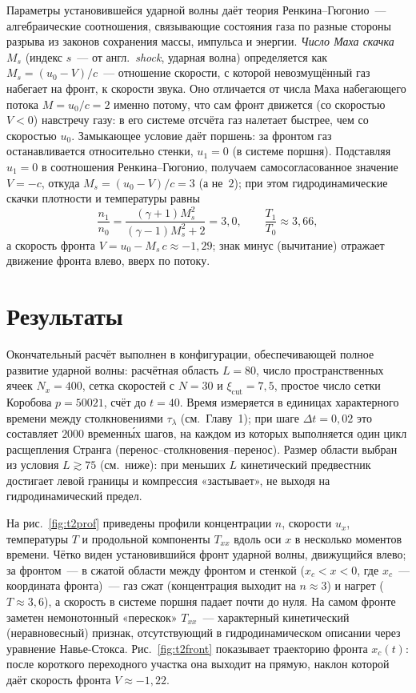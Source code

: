 \documentclass[14pt,a4paper]{extreport}
\numberwithin{equation}{chapter}
\numberwithin{figure}{chapter}
\numberwithin{table}{chapter}
\begin{document}
Параметры установившейся ударной волны даёт теория Ренкина--Гюгонио~--- алгебраические соотношения, связывающие
состояния газа по разные стороны разрыва из законов сохранения массы, импульса и энергии.
\emph{Число Маха скачка} $M_s$ (индекс $s$~--- от англ.\ \emph{shock}, ударная волна) определяется как
$M_s=(u_0-V)/c$~--- отношение скорости, с которой невозмущённый газ набегает на фронт, к скорости звука.
Оно отличается от числа Маха набегающего потока $M=u_0/c=2$ именно потому, что сам фронт движется (со скоростью $V<0$)
навстречу газу: в его системе отсчёта газ налетает быстрее, чем со скоростью $u_0$.
Замыкающее условие даёт поршень: за фронтом газ останавливается относительно стенки, $u_1=0$ (в системе поршня).
Подставляя $u_1=0$ в соотношения Ренкина--Гюгонио, получаем самосогласованное значение $V=-c$, откуда $M_s=(u_0-V)/c=3$
(а не~$2$); при этом гидродинамические скачки плотности и температуры равны
\begin{equation}
    \frac{n_1}{n_0}=\frac{(\gamma+1)M_s^2}{(\gamma-1)M_s^2+2}=3{,}0,\qquad \frac{T_1}{T_0}\approx 3{,}66,
\end{equation}
а скорость фронта $V=u_0-M_s\,c\approx-1{,}29$; знак минус (вычитание) отражает движение фронта влево, вверх по потоку.

\section{Результаты}

Окончательный расчёт выполнен в конфигурации, обеспечивающей полное развитие ударной волны: расчётная область $L=80$,
число пространственных ячеек $N_x=400$, сетка скоростей с $N=30$ и $\xi_{\mathrm{cut}}=7{,}5$, простое число сетки
Коробова $p=50021$, счёт до $t=40$.
Время измеряется в единицах характерного времени между столкновениями $\tau_\lambda$ (см.\ Главу~1); при шаге $\Delta
t=0{,}02$ это составляет $2000$ временны́х шагов, на каждом из которых выполняется один цикл расщепления Странга
(перенос--столкновения--перенос).
Размер области выбран из условия $L\gtrsim 75$ (см.\ ниже): при меньших $L$ кинетический предвестник достигает левой
границы и компрессия «застывает», не выходя на гидродинамический предел.

На рис.~\ref{fig:t2prof} приведены профили концентрации $n$, скорости $u_x$, температуры $T$ и продольной компоненты
$T_{xx}$ вдоль оси $x$ в несколько моментов времени.
Чётко виден установившийся фронт ударной волны, движущийся влево; за фронтом~--- в сжатой области между фронтом и
стенкой ($x_c<x<0$, где $x_c$~--- координата фронта)~--- газ сжат (концентрация выходит на $n\approx3$) и нагрет
($T\approx3{,}6$), а скорость в системе поршня падает почти до нуля.
На самом фронте заметен немонотонный «перескок» $T_{xx}$~--- характерный кинетический (неравновесный) признак,
отсутствующий в гидродинамическом описании через уравнение Навье-Стокса.
Рис.~\ref{fig:t2front} показывает траекторию фронта $x_c(t)$: после короткого переходного участка она выходит на прямую,
наклон которой даёт скорость фронта $V\approx-1{,}22$.
\end{document}

